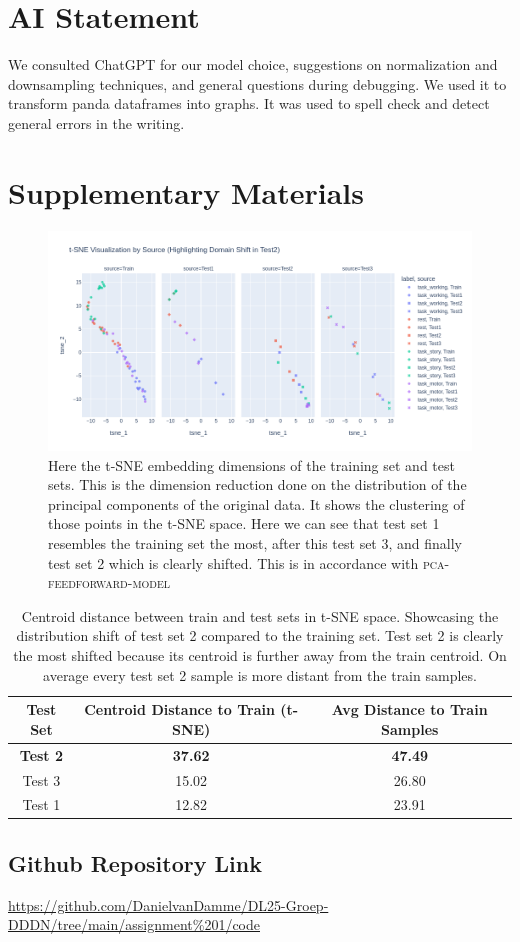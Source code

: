 \documentclass[conference]{IEEEtran}
\begin{document}
\section*{AI Statement}
We consulted ChatGPT for our model choice, suggestions on normalization and downsampling techniques, and general questions during debugging.  We used it to transform panda dataframes
into graphs. It was used to spell check and detect general errors in the writing.



\clearpage
\onecolumn

\section*{Supplementary Materials}
\begin{figure}[H]
    \centering
    \includegraphics[scale=.5]{figures/supplementary_distribution shift test set 2.png}
    \caption{Here the t-SNE  embedding dimensions of the training set and test sets. This is the dimension reduction done on the distribution of the principal components of the original data. It shows the clustering of those points in the t-SNE space. Here we can see that test set 1 resembles the training set the most, after this test set 3, and finally test set 2 which is clearly shifted. This is in accordance with \textsc{pca-feedforward-model}}
    \label{fig:tsne_distribution_shift}
\end{figure}

\begin{table}[H]
    \centering
    \begin{tabular}{|c|c|c|}
        \hline
        Test Set & Centroid Distance to Train (t-SNE) & Avg Distance to Train Samples \\
        \hline
        \textbf{Test 2} & \textbf{37.62} & \textbf{47.49} \\
        Test 3 & 15.02 & 26.80 \\
        Test 1 & 12.82 & 23.91 \\
        \hline
    \end{tabular}
    \caption{Centroid distance between train and test sets in t-SNE space. Showcasing the distribution shift of test set 2 compared to the training set. Test set 2 is clearly the most shifted because its centroid is further away from the train centroid. On average every test set 2 sample is more distant from the train samples.}
    \label{tab:centroid_distance}
\end{table}

\subsection{Github Repository Link}
\url{https://github.com/DanielvanDamme/DL25-Groep-DDDN/tree/main/assignment%201/code}
\end{document}
